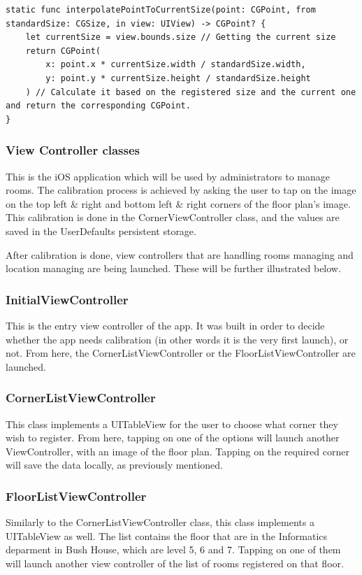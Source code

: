\begin{lstlisting}
static func interpolatePointToCurrentSize(point: CGPoint, from standardSize: CGSize, in view: UIView) -> CGPoint? {
	let currentSize = view.bounds.size // Getting the current size
	return CGPoint(
		x: point.x * currentSize.width / standardSize.width,
		y: point.y * currentSize.height / standardSize.height
	) // Calculate it based on the registered size and the current one and return the corresponding CGPoint.
}
\end{lstlisting}

\subsubsection{View Controller classes}
This is the iOS application which will be used by administrators to manage rooms. The calibration process is achieved by asking the user to tap on the image on the top left \& right and bottom left \& right corners of the floor plan's image. This calibration is done in the CornerViewController class, and the values are saved in the UserDefaults persistent storage. 

After calibration is done, view controllers that are handling rooms managing and location managing are being launched. These will be further illustrated below.

\subsubsection*{InitialViewController}
This is the entry view controller of the app. It was built in order to decide whether the app needs calibration (in other words it is the very first launch), or not. From here, the CornerListViewController or the FloorListViewController are launched.

\subsubsection*{CornerListViewController}
This class implements a UITableView for the user to choose what corner they wish to register. From here, tapping on one of the options will launch another ViewController, with an image of the floor plan. Tapping on the required corner will save the data locally, as previously mentioned.

\subsubsection*{FloorListViewController}
Similarly to the CornerListViewController class, this class implements a UITableView as well. The list contains the floor that are in the Informatics deparment in Bush House, which are level 5, 6 and 7. Tapping on one of them will launch another view controller of the list of rooms registered on that floor.

